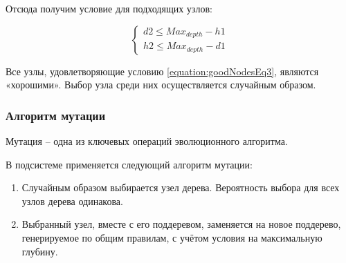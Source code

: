 \clearpage
Отсюда получим условие для подходящих узлов:

\begin{equation}
\label{equation:goodNodesEq3}
\begin{cases} d2 \leq Max_{depth} - h1 \\ h2 \leq Max_{depth} - d1  \end{cases}
\end{equation}

Все узлы, удовлетворяющие условию \ref{equation:goodNodesEq3}, являются «хорошими». Выбор узла среди них осуществляется случайным образом.

\subsubsection{Алгоритм мутации}

Мутация -- одна из ключевых операций эволюционного алгоритма.

В подсистеме применяется следующий алгоритм мутации:
\begin{enumerate}
\item Случайным образом выбирается узел дерева. Вероятность выбора для всех узлов дерева одинакова.
\item Выбранный узел, вместе с его поддеревом, заменяется на новое поддерево, генерируемое по общим правилам, с учётом условия на максимальную глубину. 
\end{enumerate}

